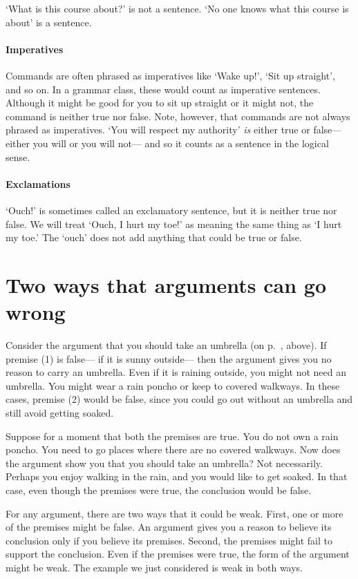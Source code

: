 `What is this course about?' is not a sentence. `No one knows what this course is about' is a sentence.

\paragraph{Imperatives} Commands are often phrased as imperatives like `Wake up!', `Sit up straight', and so on. In a grammar class, these would count as imperative sentences. Although it might be good for you to sit up straight or it might not, the command is neither true nor false. Note, however, that commands are not always phrased as imperatives. `You will respect my authority' \emph{is} either true or false--- either you will or you will not--- and so it counts as a sentence in the logical sense.

\paragraph{Exclamations} `Ouch!' is sometimes called an exclamatory sentence, but it is neither true nor false. We will treat `Ouch, I hurt my toe!' as meaning the same thing as `I hurt my toe.' The `ouch' does not add anything that could be true or false.




\section{Two ways that arguments can go wrong}
Consider the argument that you should take an umbrella (on p.~\pageref{argRaining}, above). If premise (1) is false--- if it is sunny outside--- then the argument gives you no reason to carry an umbrella. Even if it is raining outside, you might not need an umbrella. You might wear a rain poncho or keep to covered walkways. In these cases, premise (2) would be false, since you could go out without an umbrella and still avoid getting soaked.

Suppose for a moment that both the premises are true. You do not own a rain poncho. You need to go places where there are no covered walkways. Now does the argument show you that you should take an umbrella? Not necessarily. Perhaps you enjoy walking in the rain, and you would like to get soaked. In that case, even though the premises were true, the conclusion would be false.

For any argument, there are two ways that it could be weak. First, one or more of the premises might be false. An argument gives you a reason to believe its conclusion only if you believe its premises. Second, the premises might fail to support the conclusion. Even if the premises were true, the form of the argument might be weak. The example we just considered is weak in both ways.


